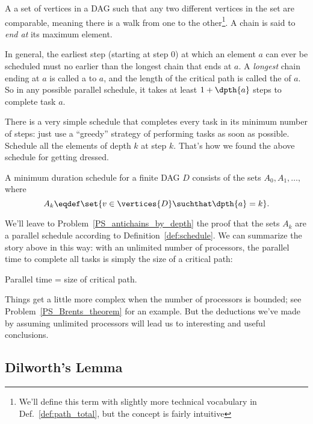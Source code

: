 \begin{definition}
A  a set of vertices in a DAG such that any two different
vertices in the set are comparable, meaning there is a walk from one
to the other\footnote{We'll define this term with slightly more
  technical vocabulary in Def.~\ref{def:path_total}, but the concept
  is fairly intuitive}.  A chain is said to \emph{end at} its maximum element.
\end{definition}
\fi

In general, the earliest step (starting at step 0) at which an element
$a$ can ever be scheduled must no earlier than the longest chain that
ends at $a$.  A \emph{longest} chain ending at $a$ is called a
 to $a$, and the length of the critical path is
called the  of $a$.  So in any possible parallel schedule,
it takes at least $1 + \dpth{a}$ steps to complete task $a$.

There is a very simple schedule that completes every task in its
minimum number of steps: just use a ``greedy'' strategy of performing
tasks as soon as possible.  Schedule all the elements of depth
$k$ at step $k$.  That's how we found the above schedule for getting dressed.

\begin{theorem}\label{thm:parallel-time}
A minimum duration schedule for a finite DAG $D$ consists of the sets
$A_0, A_1,\dots,$ where
\[
A_k \eqdef \set{v \in \vertices{D} \suchthat \dpth{a} =k}.
\]
\end{theorem}

We'll leave to Problem~\ref{PS_antichains_by_depth} the proof that the
sets $A_k$ are a parallel schedule according to
Definition~\ref{def:schedule}.  We can summarize the story above in
this way: with an unlimited number of processors, the parallel time to
complete all tasks is simply the size of a critical path:

\begin{corollary}\label{cor:critical-path-time}
Parallel time = size of critical path.
\end{corollary}

Things get a little more complex when the number of processors is
bounded; see Problem~\ref{PS_Brents_theorem} for an example. But the
deductions we've made by assuming unlimited processors will lead us to
interesting and useful conclusions.

\subsection{Dilworth's Lemma}\label{dilworth_subsec}

